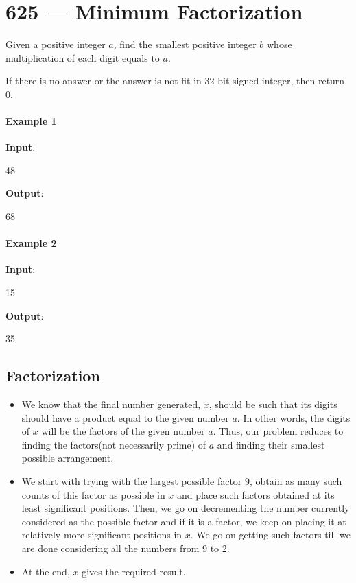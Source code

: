 \section{625 --- Minimum Factorization}
Given a positive integer $a$, find the smallest positive integer $b$ whose multiplication of each digit equals to $a$.

If there is no answer or the answer is not fit in 32-bit signed integer, then return 0.

\paragraph{Example 1}

\begin{flushleft}
\textbf{Input}:

48 

\textbf{Output}:

68
\end{flushleft}

\paragraph{Example 2}
\begin{flushleft}
\textbf{Input}:

15

\textbf{Output}:

35
\end{flushleft}

\subsection{Factorization}
\begin{itemize}
    \item We know that the final number generated, $x$, should be such that its digits should have a product equal to the given number $a$. In other words, the digits of $x$ will be the factors of the given number $a$. Thus, our problem reduces to finding the factors(not necessarily prime) of $a$ and finding their smallest possible arrangement. 
    \item We start with trying with the largest possible factor $9$, obtain as many such counts of this factor as possible in $x$ and place such factors obtained at its least significant positions. Then, we go on decrementing the number currently considered as the possible factor and if it is a factor, we keep on placing it at relatively more significant positions in $x$. We go on getting such factors till we are done considering all the numbers from 9 to 2. \item At the end, $x$ gives the required result.
\end{itemize}